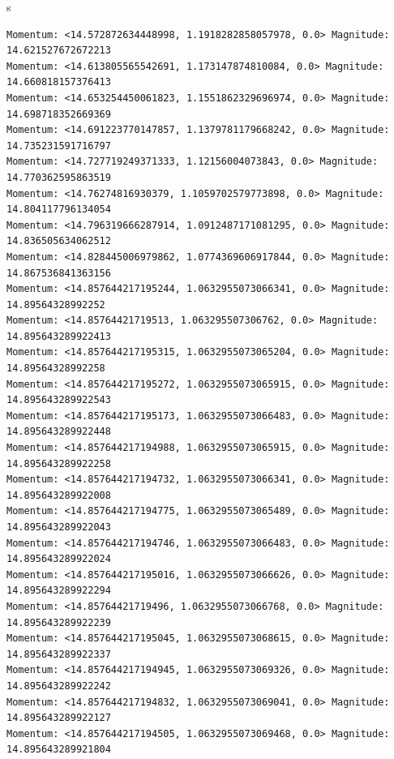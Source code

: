 s\documentclass[10pt]{article}
\begin{document}
\begin{verbatim}
Momentum: <14.572872634448998, 1.1918282858057978, 0.0> Magnitude: 14.621527672672213
Momentum: <14.613805565542691, 1.173147874810084, 0.0> Magnitude: 14.660818157376413
Momentum: <14.653254450061823, 1.1551862329696974, 0.0> Magnitude: 14.698718352669369
Momentum: <14.691223770147857, 1.1379781179668242, 0.0> Magnitude: 14.735231591716797
Momentum: <14.727719249371333, 1.12156004073843, 0.0> Magnitude: 14.770362595863519
Momentum: <14.76274816930379, 1.1059702579773898, 0.0> Magnitude: 14.804117796134054
Momentum: <14.796319666287914, 1.0912487171081295, 0.0> Magnitude: 14.836505634062512
Momentum: <14.828445006979862, 1.0774369606917844, 0.0> Magnitude: 14.867536841363156
Momentum: <14.857644217195244, 1.0632955073066341, 0.0> Magnitude: 14.89564328992252
Momentum: <14.85764421719513, 1.063295507306762, 0.0> Magnitude: 14.895643289922413
Momentum: <14.857644217195315, 1.0632955073065204, 0.0> Magnitude: 14.89564328992258
Momentum: <14.857644217195272, 1.0632955073065915, 0.0> Magnitude: 14.895643289922543
Momentum: <14.857644217195173, 1.0632955073066483, 0.0> Magnitude: 14.895643289922448
Momentum: <14.857644217194988, 1.0632955073065915, 0.0> Magnitude: 14.895643289922258
Momentum: <14.857644217194732, 1.0632955073066341, 0.0> Magnitude: 14.895643289922008
Momentum: <14.857644217194775, 1.0632955073065489, 0.0> Magnitude: 14.895643289922043
Momentum: <14.857644217194746, 1.0632955073066483, 0.0> Magnitude: 14.895643289922024
Momentum: <14.857644217195016, 1.0632955073066626, 0.0> Magnitude: 14.895643289922294
Momentum: <14.85764421719496, 1.0632955073066768, 0.0> Magnitude: 14.895643289922239
Momentum: <14.857644217195045, 1.0632955073068615, 0.0> Magnitude: 14.895643289922337
Momentum: <14.857644217194945, 1.0632955073069326, 0.0> Magnitude: 14.895643289922242
Momentum: <14.857644217194832, 1.0632955073069041, 0.0> Magnitude: 14.895643289922127
Momentum: <14.857644217194505, 1.0632955073069468, 0.0> Magnitude: 14.895643289921804
\end{verbatim}
\small
\end{document}
